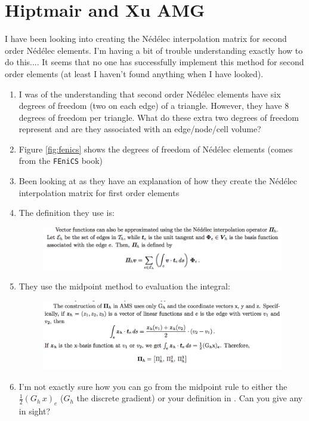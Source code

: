 \documentclass{article}
\newcommand{\nedelec}{N\'{e}d\'{e}lec }
\newcommand{\fenics}{{\tt FEniCS} }
\begin{document}
\section{Hiptmair and Xu AMG}

I have been looking into creating the \nedelec interpolation matrix for second order \nedelec elements. I'm having a bit of trouble understanding exactly how to do this.... It seems that no one has successfully implement this method for second order elements (at least I haven't found anything when I have looked).

\begin{enumerate}
    \item I was of the understanding that second order \nedelec elements have six degrees of freedom (two on each edge) of a triangle. However, they have 8 degrees of freedom per triangle. What do these extra two degrees of freedom represent and are they associated with an edge/node/cell volume?
    \item Figure \ref{fig:fenics} shows the degrees of freedom of \nedelec elements (comes from the \fenics book)
    \item Been looking at \cite{kolev2009parallel} as they have an explanation of how they create the \nedelec interpolation matrix for first order elements
    \item The definition they use is:
    \begin{figure}[h!]
        \centering
        \includegraphics[width=0.9\linewidth]{Figures/P}
    \end{figure}
    \item They use the midpoint method to evaluation the integral:
    \begin{figure}[h!]
        \centering
        \includegraphics[width=0.9\linewidth]{Figures/Midpoint}
    \end{figure}
    \item I'm not exactly sure how you can go from the midpoint rule to either the $\frac{1}{2}(G_h \,x)_e$ ($G_h$ the discrete gradient) or your definition in \cite{LiGreif10}. Can you give any in sight?

\end{enumerate}
\end{document}
